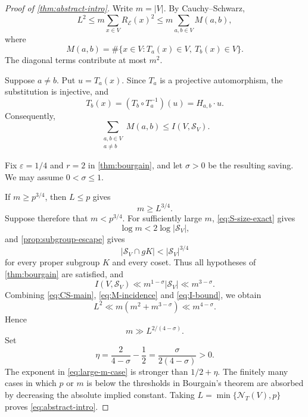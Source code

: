 \documentclass[10pt,a4paper]{amsart}
\newcommand{\cE}{\mathcal E}
\newcommand{\cN}{\mathcal N}
\newcommand{\cS}{\mathcal S}
\begin{document}
\begin{proof}[Proof of \cref{thm:abstract-intro}]
Write $m=|V|$.  By Cauchy--Schwarz,
\begin{equation}\label{eq:CS-main}
  L^2
  \le m\sum_{x\in V}R_{\cE}(x)^2
  \le m\sum_{a,b\in V}M(a,b),
\end{equation}
where
\begin{equation}\label{eq:M-ab}
  M(a,b)
  =\#\{x\in V:T_a(x)\in V,\ T_b(x)\in V\}.
\end{equation}
The diagonal terms contribute at most $m^2$.

Suppose $a\ne b$.  Put $u=T_a(x)$.  Since $T_a$ is a projective automorphism, the substitution is injective, and
\[
  T_b(x)=(T_b\circ T_a^{-1})(u)=H_{a,b}\cdot u.
\]
Consequently,
\begin{equation}\label{eq:M-incidence}
  \sum_{\substack{a,b\in V\\a\ne b}}M(a,b)
  \le I(V,\cS_V).
\end{equation}

Fix $\varepsilon=1/4$ and $r=2$ in \cref{thm:bourgain}, and let $\sigma>0$ be the resulting saving.  We may assume $0<\sigma\le1$.

If $m\ge p^{3/4}$, then $L\le p$ gives
\begin{equation}\label{eq:large-m-case}
  m\ge L^{3/4}.
\end{equation}
Suppose therefore that $m<p^{3/4}$.  For sufficiently large $m$, \eqref{eq:S-size-exact} gives
\[
  \log m<2\log|\cS_V|,
\]
and \cref{prop:subgroup-escape} gives
\[
  |\cS_V\cap gK|<|\cS_V|^{3/4}
\]
for every proper subgroup $K$ and every coset.  Thus all hypotheses of \cref{thm:bourgain} are satisfied, and
\begin{equation}\label{eq:I-bound}
  I(V,\cS_V)
  \ll m^{1-\sigma}|\cS_V|
  \ll m^{3-\sigma}.
\end{equation}
Combining \eqref{eq:CS-main}, \eqref{eq:M-incidence} and \eqref{eq:I-bound}, we obtain
\begin{equation}\label{eq:L-bound}
  L^2\ll m(m^2+m^{3-\sigma})\ll m^{4-\sigma}.
\end{equation}
Hence
\begin{equation}\label{eq:m-from-L}
  m\gg L^{2/(4-\sigma)}.
\end{equation}
Set
\begin{equation}\label{eq:eta-def}
  \eta=\frac{2}{4-\sigma}-\frac12
  =\frac{\sigma}{2(4-\sigma)}>0.
\end{equation}
The exponent in \eqref{eq:large-m-case} is stronger than $1/2+\eta$.  The finitely many cases in which $p$ or $m$ is below the thresholds in Bourgain's theorem are absorbed by decreasing the absolute implied constant.  Taking $L=\min\{\cN_T(V),p\}$ proves \eqref{eq:abstract-intro}.
\end{proof}
\end{document}
